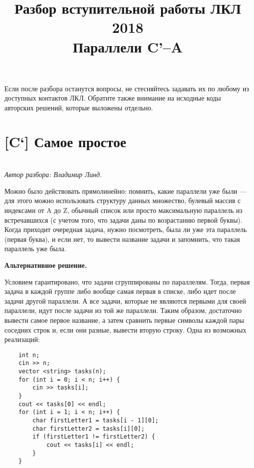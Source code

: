 \documentclass[12pt]{article}
\theoremstyle{definition}
\begin{document}
\title{Разбор вступительной работы ЛКЛ 2018\\Параллели C'--A}
\date{}

\renewcommand{\thesection}{\Alph{section}.}
\maketitle
Если после разбора останутся вопросы, не стесняйтесь задавать их по любому из доступных контактов ЛКЛ. Обратите также внимание на исходные коды авторских решений,
которые выложены отдельно.

\tableofcontents

\newcommand{\problem}[4]{\section{[#1] #2}\vspace{-0.2cm}{\textit{Автор задачи: #3.}}\\ {\textit{Автор разбора: #4.}}\vspace{0.4cm}

}

\problem{C`}{Самое простое}{Кирилл Симонов}{Владимир Линд}

Можно было действовать прямолинейно: помнить, какие параллели уже были --- для этого можно использовать структуру данных множество, булевый массив с индексами от A до Z, обычный список или просто максимальную параллель из встречавшихся (с учетом того, что задачи даны по возрастанию первой буквы). Когда приходит очередная задача, нужно посмотреть, была ли уже эта параллель (первая буква), и если нет, то вывести название задачи и запомнить, что такая параллель уже была.

\textbf{Альтернативное решение.}

Условием гарантировано, что задачи сгруппированы по параллелям. Тогда, первая задача в каждой группе либо вообще самая первая в списке, либо идет после задачи другой параллели. А все задачи, которые не являются первыми для своей параллели, идут после задачи из той же параллели. Таким образом, достаточно вывести самое первое название, а затем сравнить первые символы каждой пары соседних строк и, если они разные, вывести вторую строку. Одна из возможных реализаций:

\begin{verbatim}
    int n;
    cin >> n;
    vector <string> tasks(n);
    for (int i = 0; i < n; i++) {
        cin >> tasks[i];
    }
    cout << tasks[0] << endl;
    for (int i = 1; i < n; i++) {
        char firstLetter1 = tasks[i - 1][0];
        char firstLetter2 = tasks[i][0];
        if (firstLetter1 != firstLetter2) {
            cout << tasks[i] << endl;
        }
    }
\end{verbatim}
\end{document}

